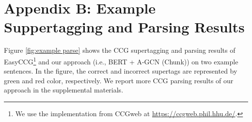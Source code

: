 \documentclass[11pt,a4paper]{article}
\begin{document}
\section*{Appendix B: Example Suppertagging and Parsing Results}



Figure \ref{fig:example parse} shows the CCG supertagging and parsing results of EasyCCG\footnote{We use the implementation from CCGweb \cite{evang-etal-2019-ccgweb} at \url{https://ccgweb.phil.hhu.de/}.} and our approach (i.e., BERT + A-GCN (Chunk)) on two example sentences.
In the figure, the correct and incorrect supertags are represented by green and red color, respectively.
We report more CCG parsing results of our approach in the supplemental materials.



\end{document}
